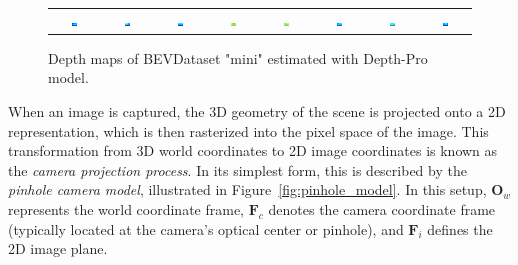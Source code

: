 \begin{figure}[!ht]
\begin{tabular}{c c c c c c c c}
        \includegraphics[width=0.12\textwidth]{images/methodology/depth_images/colored_depth_map_0.png} & 
        \includegraphics[width=0.12\textwidth]{images/methodology/depth_images/colored_depth_map_1.png} & 
        \includegraphics[width=0.12\textwidth]{images/methodology/depth_images/colored_depth_map_2.png} &
        \includegraphics[width=0.12\textwidth]{images/methodology/depth_images/colored_depth_map_3.png} &
        \includegraphics[width=0.12\textwidth]{images/methodology/depth_images/colored_depth_map_4.png} &   
        \includegraphics[width=0.12\textwidth]{images/methodology/depth_images/colored_depth_map_5.png} & 
        \includegraphics[width=0.12\textwidth]{images/methodology/depth_images/colored_depth_map_6.png} &
        \includegraphics[width=0.12\textwidth]{images/methodology/depth_images/colored_depth_map_7.png} \\
    \end{tabular}    
    \caption{Depth maps of BEVDataset "mini" estimated with Depth-Pro model.}
    \label{fig:depth_images}
\end{figure}

When an image is captured, the 3D geometry of the scene is projected onto a 2D representation, which is then rasterized into the pixel space of the image. This transformation from 3D world coordinates to 2D image coordinates is known as the \emph{camera projection process}. In its simplest form, this is described by the \emph{pinhole camera model}, illustrated in Figure~\ref{fig:pinhole_model}. In this setup, $\mathbf{O}_w$ represents the world coordinate frame, $\mathbf{F}_c$ denotes the camera coordinate frame (typically located at the camera's optical center or pinhole), and $\mathbf{F}_i$ defines the 2D image plane.


